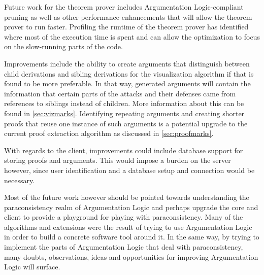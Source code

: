 \documentclass[11pt,twoside,a4paper]{report}
\begin{document}
Future work for the theorem prover includes Argumentation Logic-compliant pruning as well as other performance enhancements that will allow the theorem prover to run faster. Profiling the runtime of the theorem prover has identified where most of the execution time is spent and can allow the optimization to focus on the slow-running parts of the code.

Improvements include the ability to create arguments that distinguish between child derivations and sibling derivations for the visualization algorithm if that is found to be more preferable. In that way, generated arguments will contain the information that certain parts of the attacks and their defenses came from references to siblings instead of children. More information about this can be found in \autoref{sec:vizmarks}. Identifying repeating arguments and creating shorter proofs that reuse one instance of such arguments is a potential upgrade to the current proof extraction algorithm as discussed in \autoref{sec:proofmarks}.

With regards to the client, improvements could include database support for storing proofs and arguments. This would impose a burden on the server however, since user identification and a database setup and connection would be necessary.

Most of the future work however should be pointed towards understanding the paraconsistency realm of Argumentation Logic and perhaps upgrade the core and client to provide a playground for playing with paraconsistency. Many of the algorithms and extensions were the result of trying to use Argumentation Logic in order to build a concrete software tool around it. In the same way, by trying to implement the parts of Argumentation Logic that deal with paraconsistency, many doubts, observations, ideas and opportunities for improving Argumentation Logic will surface.

\fancyhf{}
\fancyhead[RE,LO]{\small\nouppercase{\leftmark}}
\fancyfoot[CE,CO]{\thepage}

\listoffigures

\lstlistoflistings



\end{document}
